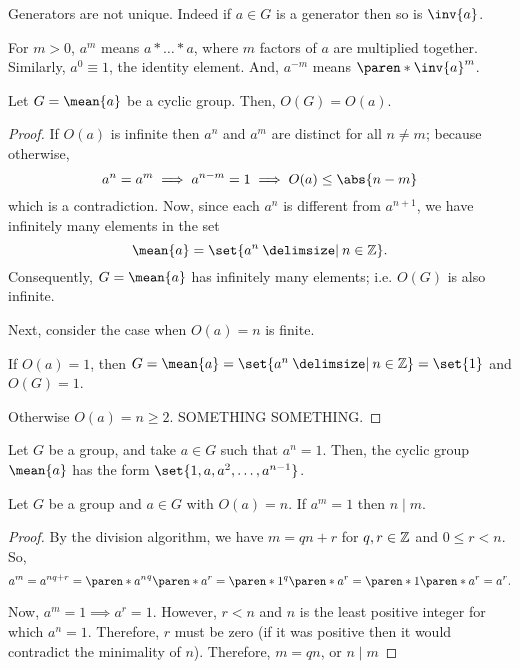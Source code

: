 \documentclass[11pt]{penrose}
\newcommand{\cyclic}[1]{\mean{#1}}
\begin{document}
Generators are not unique. Indeed if $a \in G$ is a generator then so is $\inv{a}$.

\begin{notation}
    For $m > 0$, $a^m$ means $a * \dots * a$, where $m$ factors of $a$ are multiplied together. Similarly, $a^0 \equiv 1$, the identity element. And, $a^{-m}$ means $\paren*{\inv{a}}^m$.
\end{notation}

\begin{nthm}
    Let $G = \cyclic{a}$ be a cyclic group. Then, $O(G) = O(a)$.
\end{nthm}
\begin{proof}
    If $O(a)$ is infinite then $a^n$ and $a^m$ are distinct for all $n \neq m$; because otherwise,
    \begin{equation}
        a^n = a^m \implies a^{n - m} = 1 \implies O(a) \leq \abs{n-m}
    \end{equation}
    which is a contradiction. Now, since each $a^n$ is different from $a^{n+1}$, we have infinitely many elements in the set
    \begin{equation}
        \cyclic{a} = \set{a^n \st n \in \Z}.
    \end{equation}
    Consequently, $G = \cyclic{a}$ has infinitely many elements; i.e. $O(G)$ is also infinite.

    Next, consider the case when $O(a) = n$ is finite.

    If $O(a) = 1$, then $G = \cyclic{a} = \set{a^n \st n \in \Z} = \set{1}$ and $O(G) = 1$.

    Otherwise $O(a) = n \geq 2$. SOMETHING SOMETHING.
\end{proof}

\begin{nthm}
    Let $G$ be a group, and take $a \in G$ such that $a^n = 1$. Then, the cyclic group $\cyclic{a}$ has the form $\set{1, a, a^2, \dots, a^{n-1}}$.
\end{nthm}

\begin{nthm}
    Let $G$ be a group and $a \in G$ with $O(a) = n$. If $a^m = 1$ then $n \mid m$.
\end{nthm}
\begin{proof}
    By the division algorithm, we have $m = qn + r$ for $q, r \in \mathbb{Z}$ and $0 \leq r < n$. So,
    \begin{equation}
        a^m = a^{nq + r} = \paren*{{a^n}^q} \paren*{a^r} = \paren*{1^q} \paren*{a^r} = \paren*{1} \paren*{a^r} = a^r.
    \end{equation}

    Now, $a^m = 1 \implies a^r = 1$. However, $r < n$ and $n$ is the least positive integer for which $a^n = 1$. Therefore, $r$ must be zero (if it was positive then it would contradict the minimality of $n$). Therefore, $m = qn$, or $n \mid m$
\end{proof}
\end{document}
